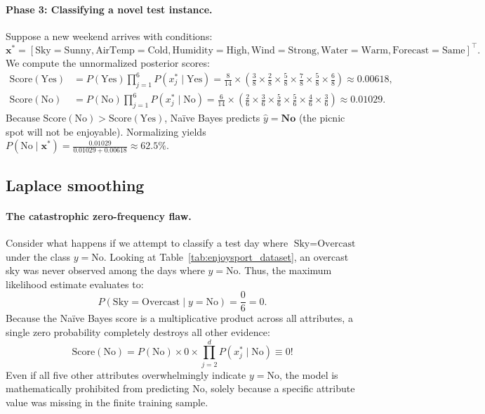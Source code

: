 \paragraph{Phase 3: Classifying a novel test instance.}
Suppose a new weekend arrives with conditions:
\begin{equation}
\mathbf{x}^* = [\text{Sky}=\text{Sunny}, \text{AirTemp}=\text{Cold}, \text{Humidity}=\text{High}, \text{Wind}=\text{Strong}, \text{Water}=\text{Warm}, \text{Forecast}=\text{Same}]^\top.
\end{equation}
We compute the unnormalized posterior scores:
\begin{align}
\text{Score}(\text{Yes}) &= P(\text{Yes}) \prod_{j=1}^6 P(x_j^* \mid \text{Yes}) = \frac{8}{14} \times \left(\frac{3}{8} \times \frac{2}{8} \times \frac{5}{8} \times \frac{7}{8} \times \frac{5}{8} \times \frac{6}{8}\right) \approx 0.00618, \\
\text{Score}(\text{No}) &= P(\text{No}) \prod_{j=1}^6 P(x_j^* \mid \text{No}) = \frac{6}{14} \times \left(\frac{2}{6} \times \frac{3}{6} \times \frac{5}{6} \times \frac{5}{6} \times \frac{4}{6} \times \frac{3}{6}\right) \approx 0.01029.
\end{align}
Because $\text{Score}(\text{No}) > \text{Score}(\text{Yes})$, Naïve Bayes predicts $\hat{y} = \textbf{No}$ (the picnic spot will not be enjoyable). Normalizing yields $P(\text{No} \mid \mathbf{x}^*) = \frac{0.01029}{0.01029 + 0.00618} \approx 62.5\%$.

\subsection{Laplace smoothing}
\label{sec:laplace_smoothing}

\paragraph{The catastrophic zero-frequency flaw.}
Consider what happens if we attempt to classify a test day where $\text{Sky} = \text{Overcast}$ under the class $y = \text{No}$. Looking at Table~\ref{tab:enjoysport_dataset}, an overcast sky was never observed among the days where $y = \text{No}$. Thus, the maximum likelihood estimate evaluates to:
\begin{equation}
P(\text{Sky} = \text{Overcast} \mid y = \text{No}) = \frac{0}{6} = 0.
\end{equation}
Because the Naïve Bayes score is a multiplicative product across all attributes, a single zero probability completely destroys all other evidence:
\begin{equation}
\text{Score}(\text{No}) = P(\text{No}) \times 0 \times \prod_{j=2}^d P(x_j^* \mid \text{No}) \equiv 0!
\end{equation}
Even if all five other attributes overwhelmingly indicate $y = \text{No}$, the model is mathematically prohibited from predicting No, solely because a specific attribute value was missing in the finite training sample.

